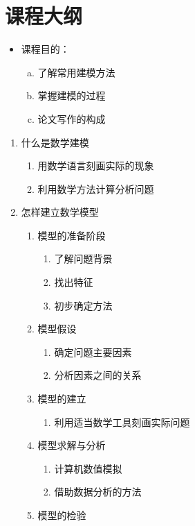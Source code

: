 \section{课程大纲}
\begin{itemize}
\item 课程目的：
\begin{enumerate}[(a)]
\item 了解常用建模方法
\item 掌握建模的过程
\item 论文写作的构成
\end{enumerate}
\end{itemize}

\begin{enumerate}
\item 什么是数学建模
    \begin{enumerate}
    \item 用数学语言刻画实际的现象
    \item 利用数学方法计算分析问题
    \end{enumerate}
\item 怎样建立数学模型
    \begin{enumerate}
    \item 模型的准备阶段
        \begin{enumerate}
        \item 了解问题背景
        \item 找出特征
        \item 初步确定方法
        \end{enumerate}
    \item 模型假设
        \begin{enumerate}
        \item 确定问题主要因素
        \item 分析因素之间的关系
        \end{enumerate}
    \item 模型的建立
        \begin{enumerate}
        \item 利用适当数学工具刻画实际问题
        \end{enumerate}
    \item 模型求解与分析
        \begin{enumerate}
        \item 计算机数值模拟
        \item 借助数据分析的方法
        \end{enumerate}
    \item 模型的检验

\end{enumerate}
\end{enumerate}
